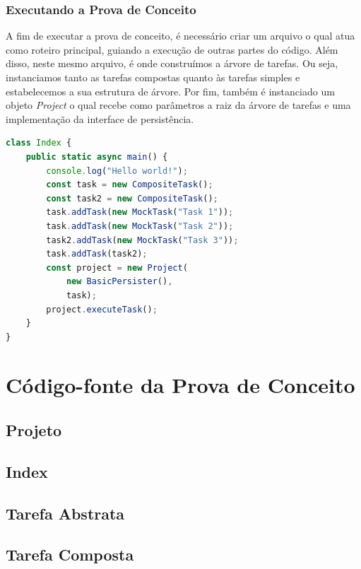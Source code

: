\documentclass[12pt]{tcc}
\begin{document}
\subsection{Executando a Prova de Conceito}
\label{sec:exe_poc}
A fim de executar a prova de conceito, é necessário criar um arquivo o qual atua como roteiro principal, guiando a execução de outras partes do código.
Além disso, neste mesmo arquivo, é onde construímos a árvore de tarefas.
Ou seja, instanciamos tanto as tarefas compostas quanto às tarefas simples e estabelecemos a sua estrutura de árvore.
Por fim, também é instanciado um objeto \emph{Project} o qual recebe como parâmetros a raiz da árvore de tarefas e uma implementação da interface de persistência.

\begin{lstlisting}[label={lst:index_ts}, caption={Exemplo de roteiro principal para executar a prova de conceito.}, language=TypeScript]
class Index {
	public static async main() {
		console.log("Hello world!");
		const task = new CompositeTask();
		const task2 = new CompositeTask();
		task.addTask(new MockTask("Task 1"));
		task.addTask(new MockTask("Task 2"));
		task2.addTask(new MockTask("Task 3"));
		task.addTask(task2);
		const project = new Project(
			new BasicPersister(),
			task);
		project.executeTask();
	}
}
\end{lstlisting}


\appendix
\chapter{Código-fonte da Prova de Conceito}
\label{apx:mock_source}

\section{Projeto}


\section{Index}


\section{Tarefa Abstrata}


\section{Tarefa Composta}

\end{document}
